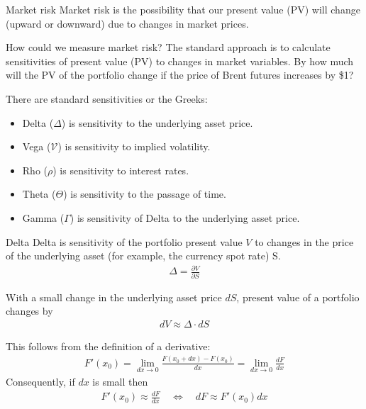 \documentclass{beamer}
\begin{document}
\begin{frame}{Market risk}
\justify
\alert{Market risk} is the possibility that our present value (PV) will change (upward or downward) due to changes in market prices.

\justify
How could we  measure market risk? The standard approach is to calculate sensitivities of present value (PV) to changes in market variables. By how much will the PV of the portfolio change if the price of Brent futures increases by \$1?

\justify
There are standard sensitivities or the Greeks:
\begin{itemize}
\item Delta ($\Delta$) is sensitivity to the underlying asset price.
\item Vega ($\mathcal{V}$) is sensitivity to implied volatility.
\item Rho ($\rho$) is sensitivity to interest rates.
\item Theta ($\Theta$) is sensitivity to the passage of time.
\item Gamma ($\Gamma$) is sensitivity of Delta to the underlying asset price.
\end{itemize}
\end{frame}



\begin{frame}{Delta}
\justify
Delta is sensitivity of the portfolio present value $V$ to changes in the price of the underlying asset (for example, the currency spot rate) S$.$
\begin{align*}
\Delta = \frac{\partial V}{\partial S}
\end{align*}

\justify
With a small change in the underlying asset price $dS$, present value of a portfolio changes by
\begin{align*}
dV \approx \Delta\cdot dS
\end{align*}

\justify
This follows from the definition of a derivative:
\begin{align*}
F'(x_0) = \lim_{dx \to 0} \frac{F(x_0+dx) - F(x_0)}{dx} = \lim_{dx \to 0} \frac{dF}{dx}
\end{align*}
Consequently, if $dx$ is small then
\begin{align*}
F'(x_0) \approx \frac{dF}{dx} \quad \Leftrightarrow \quad dF \approx F'(x_0)dx
\end{align*}
\end{frame}
\end{document}
